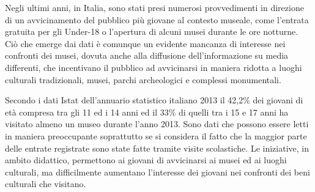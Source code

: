 Negli ultimi anni, in Italia, sono stati presi numerosi provvedimenti in direzione di un avvicinamento del pubblico più giovane al contesto museale, come l’entrata gratuita per gli Under-18 o l’apertura di alcuni musei durante le ore notturne. Ciò che emerge dai dati è comunque un evidente mancanza di interesse nei confronti dei musei, dovuta anche alla diffusione dell’informazione su media differenti, che incentivano il pubblico ad avvicinarsi in maniera ridotta a luoghi culturali tradizionali, musei, parchi archeologici e complessi monumentali.

Secondo i dati Istat dell'annuario statistico italiano 2013 \cite{DatiIstatMusei} il 42,2\% dei giovani di età compresa tra gli 11 ed i 14 anni ed il 33\% di quelli tra i 15 e 17 anni ha visitato almeno un museo durante l’anno 2013. Sono dati che possono essere letti in maniera preoccupante soprattutto se si considera il fatto che la maggior parte delle entrate registrate sono state fatte tramite visite scolastiche. Le iniziative, in ambito didattico, permettono ai giovani di avvicinarsi ai musei ed ai luoghi culturali, ma difficilmente aumentano l’interesse dei giovani nei confronti dei beni culturali che visitano.  

